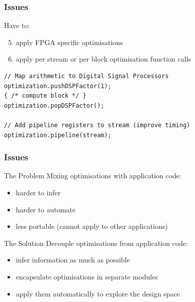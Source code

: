 \begin{frame}[fragile]
  \frametitle{Issues}
  Have to:
  \begin{enumerate}
    \setcounter{enumi}{4}
      \item apply FPGA specific optimisations
      \item apply per stream or per block optimisation function calls
      \end{enumerate}
    \begin{lstlisting}
// Map arithmetic to Digital Signal Processors
optimization.pushDSPFactor(1);
{ /* compute block */ }
optimization.popDSPFactor();

// Add pipeline registers to stream (improve timing)
optimization.pipeline(stream);

    \end{lstlisting}
\end{frame}

\begin{frame}[fragile]
  \frametitle{Issues}
    \begin{beamerboxesrounded}{The Problem}
      Mixing optimisations with application code:
      \begin{itemize}
        \item harder to infer
        \item harder to automate
        \item less portable (cannot apply to other applications)
      \end{itemize}
    \end{beamerboxesrounded}
    \begin{beamerboxesrounded}{The Solution}
      Decouple optimisations from application code:
    \begin{itemize}
    \item infer information as much as possible
    \item encapsulate optimisations in separate modules
    \item apply them automatically to explore the design space
    \end{itemize}
    \end{beamerboxesrounded}
\end{frame}

